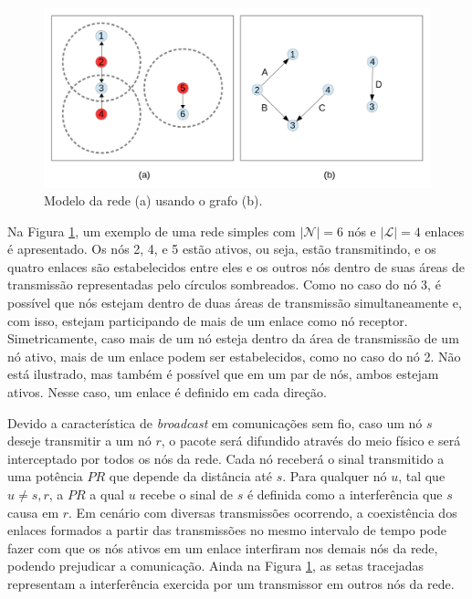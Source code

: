 \begin{figure}[htb]
\centering
\includegraphics[width=1\textwidth]{figs/grafo}
\caption[Modelo da rede (a) usando o grafo (b).]
{Modelo da rede (a) usando o grafo (b).}
\label{fig:mesh}
\end{figure}

Na Figura \ref{fig:mesh}, um exemplo de uma rede simples com $|\mathcal{N}|=6$ nós e $|\mathcal{L}|=4$ enlaces é apresentado. Os nós 2, 4, e 5 estão ativos, ou seja, estão transmitindo, e os quatro enlaces são estabelecidos entre eles e os outros nós dentro de suas áreas de transmissão representadas pelo círculos sombreados. Como no caso do nó 3, é possível que nós estejam dentro de duas áreas de transmissão simultaneamente e, com isso, estejam participando de mais de um enlace como nó receptor. Simetricamente, caso mais de um nó esteja dentro da área de transmissão de um nó ativo, mais de um enlace podem ser estabelecidos, como no caso do nó 2. Não está ilustrado, mas também é possível que em um par de nós, ambos estejam ativos. Nesse caso, um enlace é definido em cada direção.

Devido a característica de {\it broadcast} em comunicações sem fio, caso um nó $s$ deseje transmitir a um nó $r$, o pacote será difundido através do meio físico e será interceptado por todos os nós da rede. Cada nó receberá o sinal transmitido a uma potência $PR$ que depende da distância até $s$. Para qualquer nó $u$, tal que $u \neq s,r$, a $PR$ a qual $u$ recebe o sinal de $s$ é definida como a interferência que $s$ causa em $r$. Em cenário com diversas transmissões ocorrendo, a coexistência dos enlaces formados a partir das transmissões no mesmo intervalo de tempo pode fazer com que os nós ativos em um enlace interfiram nos demais nós da rede, podendo prejudicar a comunicação. Ainda na Figura \ref{fig:mesh}, as setas tracejadas representam a interferência exercida por um transmissor em outros nós da rede.


